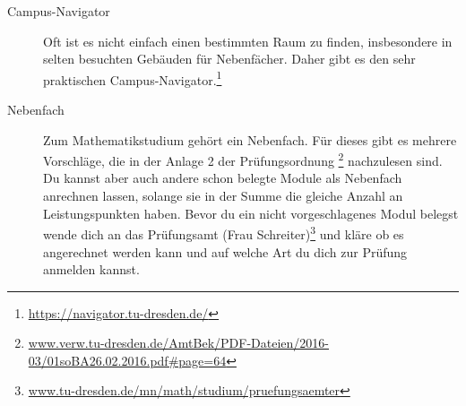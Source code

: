 \documentclass{scrartcl}
\begin{document}
\begin{description}
  \item[Campus-Navigator] Oft ist es nicht einfach einen bestimmten Raum zu finden,
    insbesondere in selten besuchten Gebäuden für Nebenfächer.
    Daher gibt es den sehr praktischen Campus-Navigator.\footnote{\url{https://navigator.tu-dresden.de/}}
  \item[Nebenfach] Zum Mathematikstudium gehört ein Nebenfach.
    Für dieses gibt es mehrere Vorschläge, die in der Anlage 2 der Prüfungsordnung
    \footnote{\url{www.verw.tu-dresden.de/AmtBek/PDF-Dateien/2016-03/01soBA26.02.2016.pdf\#page=64}}
    nachzulesen sind.
    Du kannst aber auch andere schon belegte Module als Nebenfach anrechnen lassen, solange sie in der Summe
    die gleiche Anzahl an Leistungspunkten haben.
    Bevor du ein nicht vorgeschlagenes Modul belegst wende dich an das Prüfungsamt (Frau Schreiter)\footnote{\url{www.tu-dresden.de/mn/math/studium/pruefungsaemter}\label{pruefungsamt}}
    und kläre ob es angerechnet werden kann und auf welche Art
    du dich zur Prüfung anmelden kannst.


\end{description}
\end{document}
